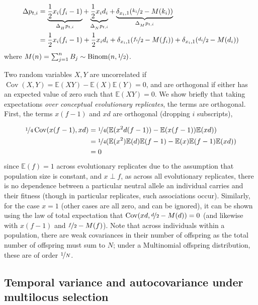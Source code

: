 \documentclass[11pt]{article}
\newcommand{\E}{\mathbb{E}}
\DeclareMathOperator{\cov}{Cov}
\begin{document}
\begin{align}
  \Delta p_{t,i} &= \underbrace{\frac{1}{2} x_i (f_i - 1)}_{\Delta_{_H} p_{t,i}} + 
       \underbrace{\frac{1}{2} x_i d_i}_{\Delta_{_N} p_{t,i}} + 
       \underbrace{\delta_{x_i,1}(\nicefrac{k_i}{2} - M(k_i))}_{\Delta_{_M} p_{t,i}} \\
       &= \frac{1}{2} x_i (f_i - 1) + 
       \frac{1}{2} x_i d_i + 
       \delta_{x_i,1}(\nicefrac{f_i}{2} - M(f_i)) + 
       \delta_{x_i,1}(\nicefrac{d_i}{2} - M(d_i))
\end{align}
%
where $M(n) = \sum_{j=1}^{n} B_j \sim \text{Binom}(n, \nicefrac{1}{2})$.

Two random variables $X, Y$ are uncorrelated if $\cov(X, Y) = \E(XY)
- \E(X)\E(Y)= 0$, and are orthogonal if either has an expected value of zero
such that $\E(XY) = 0$. We show briefly that taking expectations \emph{over
conceptual evolutionary replicates}, the terms are orthogonal. First, the terms
$x(f-1)$ and $x d$ are orthogonal (dropping $i$ subscripts),

\begin{align}
  \nicefrac{1}{4} \cov(x(f-1), x d) &= \nicefrac{1}{4}(\E(x^2 d (f-1)) - \E(x(f-1)) \E(x d)) \nonumber \\
                                    &= \nicefrac{1}{4} (\E(x^2) \E(d) \E(f-1) - \E(x)\E(f-1) \E(x d)) \nonumber \\
                                    &= 0
\end{align}
%
since $\E(f) = 1$ across evolutionary replicates due to the assumption that
population size is constant, and $x \perp f$, as across all evolutionary
replicates, there is no dependence between a particular neutral allele an
individual carries and their fitness (though in particular replicates, such
associations occur). Similarly, for the case $x=1$ (other cases are all zero,
and can be ignored), it can be shown using the law of total expectation that
$\cov(x d, \nicefrac{d}{2} - M(d)) = 0$ (and likewise with $x (f-1)$ and
$\nicefrac{f}{2} - M(f)$). Note that across individuals within a population,
there are weak covariances in their number of offspring as the total number of
offspring must sum to $N$; under a Multinomial offspring distribution, these
are of order $\nicefrac{1}{N}$.


\subsection{Temporal variance and autocovariance under multilocus selection}
\label{ap:multilocus}
\end{document}
